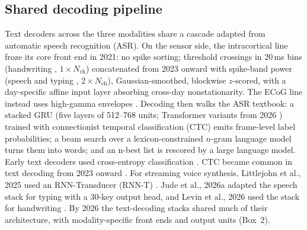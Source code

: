 \documentclass[11pt]{article}
\begin{document}
\subsection{Shared decoding pipeline}

Text decoders across the three modalities share a cascade adapted from
automatic speech recognition (ASR). On the sensor side, the intracortical line
froze its core front end in 2021: no spike sorting; threshold crossings in
20\,ms bins (handwriting \cite{willett2021, fan2023}, $1\times N_{\text{ch}}$)
concatenated from 2023 onward with spike-band power (speech and typing
\cite{card2024, willett2023, jude2026typing}, $2\times N_{\text{ch}}$),
Gaussian-smoothed, blockwise $z$-scored, with a
day-specific affine input layer absorbing cross-day nonstationarity. The ECoG line
instead uses high-gamma envelopes \cite{moses2021}. Decoding then walks
the ASR textbook: a stacked GRU (five layers of 512--768 units;
Transformer variants from 2026 \cite{fogg2026, card2026}) trained with
connectionist temporal classification (CTC) \cite{graves2006} emits
frame-level label probabilities; a beam search over a lexicon-constrained
$n$-gram language model turns them into words; and an n-best list is
rescored by a large language model. Early text decoders used cross-entropy classification
\cite{moses2021, willett2021, metzger2022, silva2024}. CTC became common in
text decoding from 2023 onward
\cite{card2024, metzger2023, willett2023, jude2026lis, jude2026typing, kunz2025, fogg2026, nason2026}.
For streaming voice synthesis, Littlejohn et al., 2025 used an
RNN-Transducer (RNN-T) \cite{littlejohn2025}.
Jude et al., 2026a adapted the speech stack for typing with a 30-key
output head, and Levin et al., 2026 used the stack for handwriting
\cite{levin2026}. By 2026 the text-decoding stacks shared much of their architecture,
with modality-specific front ends and output units (Box~2).
\end{document}
